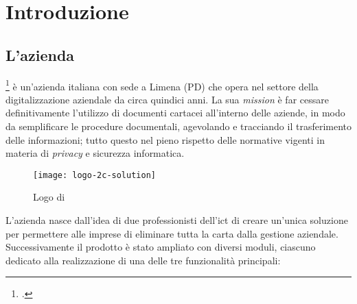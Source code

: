 
\chapter{Introduzione}
\label{cap:introduzione}

%
%
%

\section{L'azienda}

\myCompany{} \companyTitle{}\footcite{site:2c-solution} è un'azienda italiana con sede a Limena (PD) che opera nel settore della digitalizzazione aziendale da circa quindici anni. La sua \textit{mission} è far cessare definitivamente l'utilizzo di documenti cartacei all'interno delle aziende, in modo da semplificare le procedure documentali, agevolando e tracciando il trasferimento delle informazioni; tutto questo nel pieno rispetto delle normative vigenti in materia di \textit{privacy} e sicurezza informatica.

\begin{figure}[!h] 
	\centering 
	\texttt{[image: logo-2c-solution]} 
	\caption{Logo di \myCompany{} \companyTitle}
\end{figure}

L'azienda nasce dall'idea di due professionisti dell'\gls{ict}\glsfirstoccur{} di creare un'unica soluzione per permettere alle imprese di eliminare tutta la carta dalla gestione aziendale. Successivamente il prodotto è stato ampliato con diversi moduli, ciascuno dedicato alla realizzazione di una delle tre funzionalità principali:

